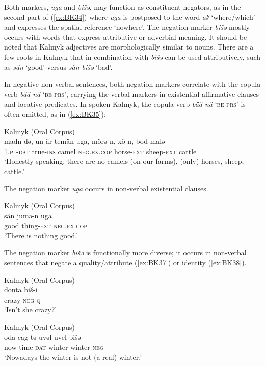 \documentclass[output=paper,draft,draftmode,colorlinks,citecolor=brown]{langscibook}
\begin{document}
Both markers, \textit{uga} and \textit{bišǝ}, may function as constituent negators, as in the second part of (\ref{ex:BK34}) where \textit{uga} is postposed to the word \textit{alʲ} ‘where/which’ and expresses the spatial reference ‘nowhere’. The negation marker \textit{bišǝ} mostly occurs with words that express attributive or adverbial meaning. It should be noted that Kalmyk adjectives are morphologically similar to nouns. There are a few roots in Kalmyk that in combination with \textit{bišǝ} can be used attributively, such as \textit{sän} ‘good’ versus \textit{sän bišǝ} ‘bad’.

In negative non-verbal sentences, both negation markers correlate with the copula verb \textit{bää-nä} ‘\textsc{be-prs}’, carrying the verbal markers in existential affirmative clauses and locative predicates. In spoken Kalmyk, the copula verb \textit{bää-nä} ‘\textsc{be-prs}’ is often omitted, as in (\ref{ex:BK35}):

\ea Kalmyk (Oral Corpus) \label{ex:BK35}\\
	\gll madn-də,		un-är		temän	uga,	mörə-n,		xö-n,			bod-malə\\
	1.\textsc{pl-dat}		true-\textsc{ins}	camel	\textsc{neg.ex.cop}	horse-\textsc{ext}	sheep-\textsc{ext}	cattle\\
	\glt `Honestly speaking, there are no camels (on our farms), (only) horses, sheep, cattle.'
\z


The negation marker \textit{uga} occurs in non-verbal existential clauses.

\ea Kalmyk (Oral Corpus) \label{ex:BK36}\\
	\gll sän		jumǝ-n		uga\\
	good	thing-\textsc{ext}	\textsc{neg.ex.cop}\\
	\glt `There is nothing good.'
\z


The negation marker \textit{bišǝ} is functionally more diverse; it occurs in non-verbal sentences that negate a quality/attribute (\ref{ex:BK37}) or identity (\ref{ex:BK38}).

\ea Kalmyk (Oral Corpus) \label{ex:BK37}\\
	\gll donta		biš-i\\
	crazy		\textsc{neg-q}\\
	\glt `Isn’t she crazy?'
\z

\ea Kalmyk (Oral Corpus) \label{ex:BK38}\\
	\gll oda	cag-tə		uvəl		uvel		bišǝ\\
	now	time-\textsc{dat}	winter	winter	\textsc{neg}\\
	\glt `Nowadays the winter is not (a real) winter.'
\z
\end{document}
